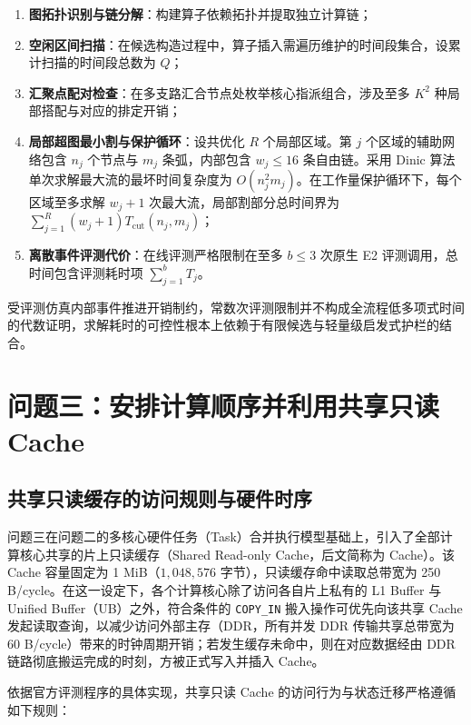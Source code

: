 \documentclass[anonymous,notoc]{gmcm2026}
\providecommand{\tightlist}{\setlength{\itemsep}{0pt}\setlength{\parskip}{0pt}}
\begin{document}
\begin{enumerate}
\def\labelenumi{\arabic{enumi}.}
\tightlist
\item
  \textbf{图拓扑识别与链分解}：构建算子依赖拓扑并提取独立计算链；
\item
  \textbf{空闲区间扫描}：在候选构造过程中，算子插入需遍历维护的时间段集合，设累计扫描的时间段总数为 \(Q\)；
\item
  \textbf{汇聚点配对检查}：在多支路汇合节点处枚举核心指派组合，涉及至多 \(K^2\) 种局部搭配与对应的排定开销；
\item
  \textbf{局部超图最小割与保护循环}：设共优化 \(R\) 个局部区域。第 \(j\) 个区域的辅助网络包含 \(n_j\) 个节点与 \(m_j\) 条弧，内部包含 \(w_j \le 16\) 条自由链。采用 Dinic 算法\cite{ref9}单次求解最大流的最坏时间复杂度为 \(O(n_j^2 m_j)\)。在工作量保护循环下，每个区域至多求解 \(w_j + 1\) 次最大流，局部割部分总时间界为 \(\sum_{j=1}^R (w_j + 1) T_{\mathrm{cut}}(n_j, m_j)\)；
\item
  \textbf{离散事件评测代价}：在线评测严格限制在至多 \(b \le 3\) 次原生 E2 评测调用，总时间包含评测耗时项 \(\sum_{j=1}^b T_j\)。
\end{enumerate}

受评测仿真内部事件推进开销制约，常数次评测限制并不构成全流程低多项式时间的代数证明，求解耗时的可控性根本上依赖于有限候选与轻量级启发式护栏的结合。


\section{问题三：安排计算顺序并利用共享只读Cache}

\subsection{共享只读缓存的访问规则与硬件时序}

问题三在问题二的多核心硬件任务（Task）合并执行模型基础上，引入了全部计算核心共享的片上只读缓存（Shared Read-only Cache，后文简称为 Cache）。该 Cache 容量固定为 1 MiB（\(1{,}048{,}576\) 字节），只读缓存命中读取总带宽为 250 B/cycle。在这一设定下，各个计算核心除了访问各自片上私有的 L1 Buffer 与 Unified Buffer（UB）之外，符合条件的 \texttt{COPY\_IN} 搬入操作可优先向该共享 Cache 发起读取查询，以减少访问外部主存（DDR，所有并发 DDR 传输共享总带宽为 60 B/cycle）带来的时钟周期开销；若发生缓存未命中，则在对应数据经由 DDR 链路彻底搬运完成的时刻，方被正式写入并插入 Cache。

依据官方评测程序的具体实现，共享只读 Cache 的访问行为与状态迁移严格遵循如下规则：
\end{document}
